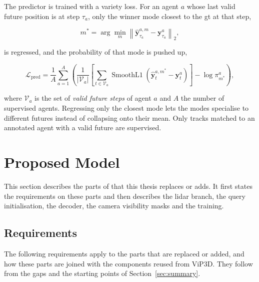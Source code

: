 The predictor is trained with a variety loss. For an agent $a$ whose last valid future position is at step
$\tau_a$, only the winner mode closest to the \ac{gt} at that step,

\begin{equation}
    m^{*} = \arg\min_{m} \left\lVert \hat{\mathbf{y}}^{a,m}_{\tau_a} - \mathbf{y}^{a}_{\tau_a} \right\rVert_2,
    \label{eq:design-bestmode}
\end{equation}

is regressed, and the probability of that mode is pushed up,

\begin{equation}
    \mathcal{L}_{\mathrm{pred}} = \frac{1}{A} \sum_{a=1}^{A} \left( \frac{1}{\lvert \mathcal{V}_a \rvert}
    \left[ \sum_{t \in \mathcal{V}_a} \operatorname{SmoothL1}\!\left( \hat{\mathbf{y}}^{a,m^{*}}_t -
    \mathbf{y}^{a}_t \right) \right] - \log \pi^{a}_{m^{*}} \right),
    \label{eq:design-predloss}
\end{equation}

where $\mathcal{V}_a$ is the set of \emph{valid future steps} of agent $a$ and $A$ the number of supervised agents.
Regressing only the closest mode lets the modes specialise to different futures instead of collapsing onto
their mean. Only tracks matched to an annotated agent with a valid future are supervised.


\section{Proposed Model}
\label{sec:design-proposed}

This section describes the parts of \modelname that this thesis replaces or adds. It first states the
requirements on these parts and then describes the \ac{lidar} branch, the query initialisation, the decoder,
the camera visibility masks and the training.

\subsection{Requirements}
\label{sec:design-requirements}

The following requirements apply to the parts that are replaced or added, and how these parts
are joined with the components reused from ViP3D. They follow from the gaps and the starting points of
Section~\ref{sec:summary}.

